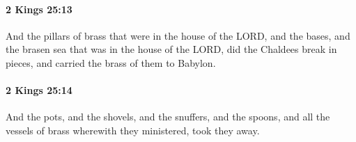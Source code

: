 		\paragraph{2 Kings 25:13} %
			\label{2KINGS-25-13}

			And the pillars of brass that were in the house of the LORD, and the bases, and the brasen sea that was in the house of the LORD, did the Chaldees break in pieces, and carried the brass of them to Babylon.


		\paragraph{2 Kings 25:14} %
			\label{2KINGS-25-14}

			And the pots, and the shovels, and the snuffers, and the spoons, and all the vessels of brass wherewith they ministered, took they away.


